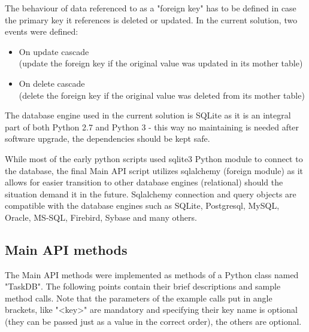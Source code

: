 \noindent
The behaviour of data referenced to as a "foreign key" has to be defined in case the primary key it references is deleted or updated. In the current solution, two events were defined:

\begin{itemize}
    \item On update cascade \\ (update the foreign key if the original value was updated in its mother table)
    \item On delete cascade \\ (delete the foreign key if the original value was deleted from its mother table)
\end{itemize}


\noindent
The database engine used in the current solution is SQLite as it is an integral part of both Python 2.7 and Python 3 - this way no maintaining is needed after software upgrade, the dependencies should be kept safe.
\newline

\noindent
While most of the early python scripts used sqlite3 Python module to connect to the database, the final Main API script utilizes sqlalchemy (foreign module) as it allows for easier transition to other database engines (relational) should the situation demand it in the future. Sqlalchemy connection and query objects are compatible with the database engines such as SQLite, Postgresql, MySQL, Oracle, MS-SQL, Firebird, Sybase and many others.


\subsection{Main API methods}
\hspace{0.6cm}

The Main API methods were implemented as methods of a Python class named "TaskDB". The following points contain their brief descriptions and sample method calls. Note that the parameters of the example calls put in angle brackets, like "<key>" are mandatory and specifying their key name is optional (they can be passed just as a value in the correct order), the others are optional.  


